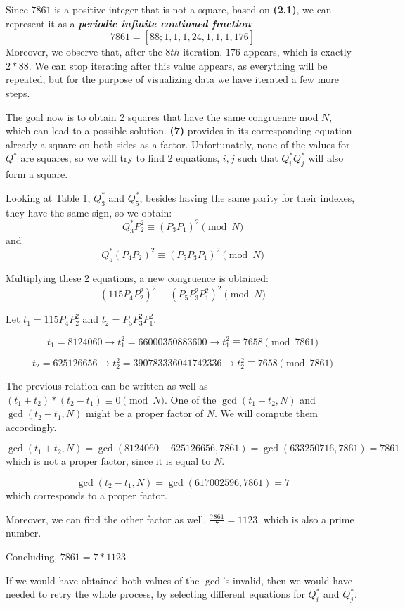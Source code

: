 \documentclass[12pt]{article}
\theoremstyle{definition}
\begin{document}
Since $7861$ is a positive integer that is not a square, based on \textbf{(2.1)}, we can represent it as a \textit{\textbf{periodic infinite continued fraction}}:
\[
7861 = [88; \overline{1, 1, 1, 24, 1, 1, 1, 176}]
\]
Moreover, we observe that, after the $8th$ iteration, $176$ appears, which is exactly $2 * 88$. We can stop iterating after this value appears, as everything will be repeated, but for the purpose of visualizing data we have iterated a few more steps.

The goal now is to obtain 2 squares that have the same congruence mod $N$, which can lead to a possible solution. \textbf{(7)} provides in its corresponding equation already a square on both sides as a factor. Unfortunately, none of the values for $Q^*$ are squares, so we will try to find 2 equations, $i, j$ such that $Q_i^* Q_j^*$ will also form a square. 

Looking at Table 1, $Q_{3}^*$ and $Q_{5}^*$, besides having the same parity for their indexes, they have the same sign, so we obtain:
\[
    Q_3^*P_2^2 \equiv (P_3P_1)^2 \pmod N
\]
and
\[
    Q_{5}^*(P_{4}P_{2})^2 \equiv (P_{5}P_{3}P_{1})^2 \pmod N
\]

Multiplying these 2 equations, a new congruence is obtained:
\[
    (115P_{4}P_2^2)^2 \equiv (P_5P_3^2P_1^2)^2 \pmod N
\]

Let $t_1 = 115P_{4}P_2^2$ and $t_2 = P_5P_3^2P_1^2$.

\[
t_1= 8124060 \longrightarrow t_1^2=66000350883600 \longrightarrow t_1^2 \equiv 7658 \pmod{7861}
\]

\[
t_2= 625126656 \longrightarrow t_2^2 =390783336041742336 \longrightarrow t_2^2\equiv 7658 \pmod{7861}
\]

The previous relation can be written as well as $(t_1 + t_2) * (t_2 - t_1) \equiv0 \pmod N$. One of the $\gcd(t_1 + t_2, N)$ and $\gcd(t_2 - t_1, N)$ might be a proper factor of $N$. We will compute them accordingly.

\[\gcd (t_1 + t_2, N) = \gcd(8124060 + 625126656, 7861) = \gcd(633250716, 7861) = 7861
\]
which is not a proper factor, since it is equal to $N$.

\[\gcd (t_2 - t_1, N) = \gcd(617002596, 7861) = 7
\]
which corresponds to a proper factor.

Moreover, we can find the other factor as well, $\frac{7861}{7} = 1123$, which is also a prime number.

Concluding, $7861 = 7 * 1123$

If we would have obtained both values of the $\gcd$'s invalid, then we would have needed to retry the whole process, by selecting different equations for  $Q_i^*$ and $Q_j^*$.
\end{document}
